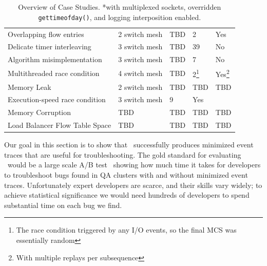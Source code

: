 \begin{table}
\begin{tabular}{l|l|l|l|l|}
Overlapping flow entries & 2 switch mesh & TBD & 2 & Yes \\
Delicate timer interleaving & 3 switch mesh & TBD & 39 & No \\
Algorithm misimplementation & 3 switch mesh & TBD & 7 & No \\
Multithreaded race condition & 4 switch mesh & TBD & 2\footnote{The race
condition triggered by any I/O events, so the final MCS was essentially
random} & Yes\footnote{With multiple replays per subsequence} \\
Memory Leak & 2 switch mesh & TBD & TBD & TBD \\
Execution-speed race condition & 3 switch mesh & 9 & Yes \\
Memory Corruption & TBD & TBD & TBD & TBD \\
Load Balancer Flow Table Space & TBD & TBD & TBD & TBD \\
\end{tabular}
\caption{Overview of Case Studies. \newline
\textmd{*with multiplexed sockets, overridden {\tt gettimeofday()}, and
logging interposition enabled.}}
\label{tab:case_studies}
\end{table}

Our goal in this section is to show that \projectname~successfully produces
minimized event traces that are useful for troubleshooting. The
gold standard for evaluating \projectname~would be a large scale A/B test~\cite{neyman}
showing how much time it takes for developers to troubleshoot bugs found in
QA clusters with and without minimized event traces. Unfortunately
expert developers are scarce, and their skills vary widely; to achieve statistical significance we would
need hundreds of developers to spend substantial time on each bug we find.


